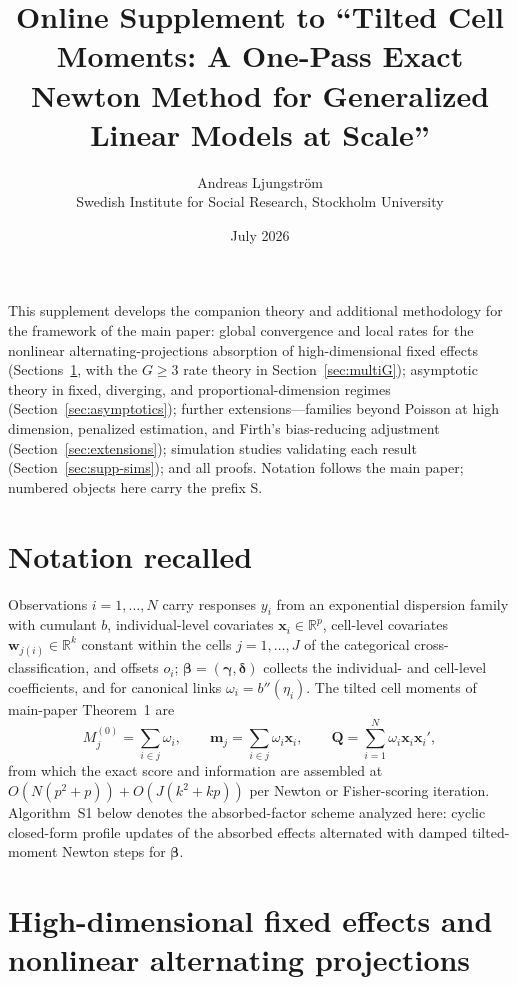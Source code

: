 \documentclass[11pt]{article}
\title{Online Supplement to ``Tilted Cell Moments: A One-Pass Exact
Newton Method for Generalized Linear Models at Scale''}
\author{Andreas Ljungstr\"om\\
\small Swedish Institute for Social Research, Stockholm University}
\date{July 2026}
\newcommand{\R}{\mathbb{R}}
\newcommand{\bbeta}{\bm{\beta}}
\newcommand{\bgamma}{\bm{\gamma}}
\newcommand{\bdelta}{\bm{\delta}}
\newcommand{\bx}{\mathbf{x}}
\newcommand{\bw}{\mathbf{w}}
\newcommand{\bQ}{\mathbf{Q}}
\begin{document}
\maketitle

\noindent This supplement develops the companion theory and additional
methodology for the framework of the main paper: global convergence and
local rates for the nonlinear alternating-projections absorption of
high-dimensional fixed effects (Sections~\ref{sec:hdfe}, with the
$G \ge 3$ rate theory in Section~\ref{sec:multiG}); asymptotic theory in
fixed, diverging, and proportional-dimension regimes
(Section~\ref{sec:asymptotics}); further extensions---families beyond
Poisson at high dimension, penalized estimation, and Firth's
bias-reducing adjustment (Section~\ref{sec:extensions}); simulation
studies validating each result (Section~\ref{sec:supp-sims}); and all
proofs.  Notation follows the main paper; numbered objects here carry
the prefix S.

\section*{Notation recalled}

Observations $i = 1, \dots, N$ carry responses $y_i$ from an exponential
dispersion family with cumulant $b$, individual-level covariates
$\bx_i \in \R^p$, cell-level covariates $\bw_{j(i)} \in \R^k$ constant
within the cells $j = 1, \dots, J$ of the categorical
cross-classification, and offsets $o_i$; $\bbeta = (\bgamma, \bdelta)$
collects the individual- and cell-level coefficients, and for canonical
links $\omega_i = b''(\eta_i)$.  The tilted cell moments of main-paper
Theorem~1 are
\begin{equation}\label{eq:s-moments}
M_j^{(0)} = \sum_{i \in j} \omega_i, \qquad
\mathbf{m}_j = \sum_{i \in j} \omega_i \bx_i, \qquad
\bQ = \sum_{i=1}^N \omega_i \bx_i \bx_i' ,
\end{equation}
from which the exact score and information are assembled at
$O(N(p^2 + p)) + O(J(k^2 + kp))$ per Newton or Fisher-scoring iteration.
Algorithm~S1 below denotes the absorbed-factor scheme
analyzed here: cyclic closed-form profile updates of the absorbed
effects alternated with damped tilted-moment Newton steps for $\bbeta$.

\section{High-dimensional fixed effects and nonlinear alternating
projections}\label{sec:hdfe}
\end{document}
